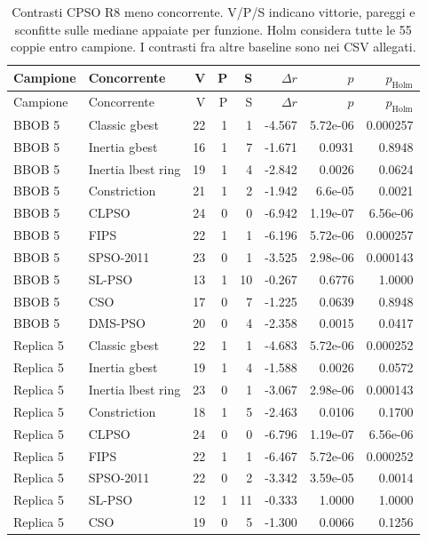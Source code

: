 \small
\begin{longtable}{@{}llrrrrrr@{}}
\caption{Contrasti CPSO R8 meno concorrente. V/P/S indicano vittorie, pareggi e sconfitte sulle mediane appaiate per funzione. Holm considera tutte le 55 coppie entro campione. I contrasti fra altre baseline sono nei CSV allegati.}\label{tab:family-contrasts}\\
\toprule Campione & Concorrente & V & P & S & $\Delta r$ & $p$ & $p_{\mathrm{Holm}}$\\\midrule\endfirsthead
\toprule Campione & Concorrente & V & P & S & $\Delta r$ & $p$ & $p_{\mathrm{Holm}}$\\\midrule\endhead
\bottomrule\endfoot
BBOB 5 & Classic gbest & 22 & 1 & 1 & -4.567 & 5.72e-06 & 0.000257\\
BBOB 5 & Inertia gbest & 16 & 1 & 7 & -1.671 & 0.0931 & 0.8948\\
BBOB 5 & Inertia lbest ring & 19 & 1 & 4 & -2.842 & 0.0026 & 0.0624\\
BBOB 5 & Constriction & 21 & 1 & 2 & -1.942 & 6.6e-05 & 0.0021\\
BBOB 5 & CLPSO & 24 & 0 & 0 & -6.942 & 1.19e-07 & 6.56e-06\\
BBOB 5 & FIPS & 22 & 1 & 1 & -6.196 & 5.72e-06 & 0.000257\\
BBOB 5 & SPSO-2011 & 23 & 0 & 1 & -3.525 & 2.98e-06 & 0.000143\\
BBOB 5 & SL-PSO & 13 & 1 & 10 & -0.267 & 0.6776 & 1.0000\\
BBOB 5 & CSO & 17 & 0 & 7 & -1.225 & 0.0639 & 0.8948\\
BBOB 5 & DMS-PSO & 20 & 0 & 4 & -2.358 & 0.0015 & 0.0417\\
Replica 5 & Classic gbest & 22 & 1 & 1 & -4.683 & 5.72e-06 & 0.000252\\
Replica 5 & Inertia gbest & 19 & 1 & 4 & -1.588 & 0.0026 & 0.0572\\
Replica 5 & Inertia lbest ring & 23 & 0 & 1 & -3.067 & 2.98e-06 & 0.000143\\
Replica 5 & Constriction & 18 & 1 & 5 & -2.463 & 0.0106 & 0.1700\\
Replica 5 & CLPSO & 24 & 0 & 0 & -6.796 & 1.19e-07 & 6.56e-06\\
Replica 5 & FIPS & 22 & 1 & 1 & -6.467 & 5.72e-06 & 0.000252\\
Replica 5 & SPSO-2011 & 22 & 0 & 2 & -3.342 & 3.59e-05 & 0.0014\\
Replica 5 & SL-PSO & 12 & 1 & 11 & -0.333 & 1.0000 & 1.0000\\
Replica 5 & CSO & 19 & 0 & 5 & -1.300 & 0.0066 & 0.1256\\

\end{longtable}
